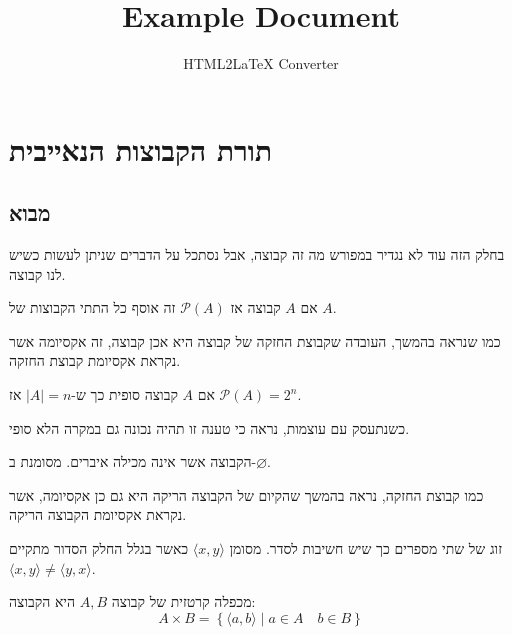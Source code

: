 \documentclass{tstextbook}
\begin{document}
\title{Example Document}
\author{HTML2LaTeX Converter}
\maketitle

\section{תורת הקבוצות הנאייבית}

\subsection{מבוא}

בחלק הזה עוד לא נגדיר במפורש מה זה קבוצה, אבל נסתכל על הדברים שניתן לעשות כשיש לנו קבוצה. 

\begin{definition}
אם \(A\) קבוצה אז \(\mathcal{P}(A)\) זה אוסף כל התתי הקבוצות של \(A\).

\end{definition}
\begin{remark}
כמו שנראה בהמשך, העובדה שקבוצת החזקה של קבוצה היא אכן קבוצה, זה אקסיומה אשר נקראת אקסיומת קבוצת החזקה.

\end{remark}
\begin{proposition}
אם \(A\) קבוצה סופית כך ש-\(|A|=n\) אז \(\mathcal{P}(A)=2^{n}\).

\end{proposition}
\begin{remark}
כשנתעסק עם עוצמות, נראה כי טענה זו תהיה נכונה גם במקרה הלא סופי.

\end{remark}
\begin{definition}
הקבוצה אשר אינה מכילה איברים. מסומנת ב-\(\varnothing\).

\end{definition}
\begin{remark}
כמו קבוצת החזקה, נראה בהמשך שהקיום של הקבוצה הריקה היא גם כן אקסיומה, אשר נקראת אקסיומת הקבוצה הריקה.

\end{remark}
\begin{definition}
זוג של שתי מספרים כך שיש חשיבות לסדר. מסומן \(\langle x,y \rangle\) כאשר בגלל החלק הסדור מתקיים \(\langle x, y \rangle\neq \langle y, x \rangle\).

\end{definition}
\begin{definition}
מכפלה קרטזית של קבוצה \(A,B\) היא הקבוצה:
$$A\times B = \left\{  \langle a, b \rangle \mid a\in A\quad b \in B  \right\}$$

\end{definition}
\end{document}

